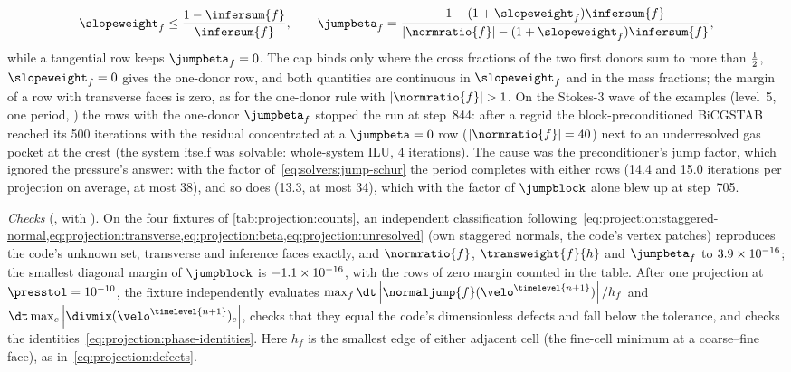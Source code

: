 \begin{equation}\label{eq:projection:dominant-slope}
  \slopeweight_f\le\frac{1-\infersum{f}}{\infersum{f}},\qquad
  \jumpbeta_f=\frac{1-(1+\slopeweight_f)\infersum{f}}{\abs{\normratio{f}}-(1+\slopeweight_f)\infersum{f}},
\end{equation}
while a tangential row keeps $\jumpbeta_f=0$. The cap binds only where the
cross fractions of the two first donors sum to more than $\frac{1}{2}$,
$\slopeweight_f=0$
gives the one-donor row, and both quantities are continuous in
$\slopeweight_f$ and in the mass fractions; the margin of a row with
transverse faces is zero, as for the one-donor rule with
$\abs{\normratio{f}}>1$. On the Stokes-3 wave of the examples (level~5,
one period, ) the rows with the one-donor $\jumpbeta_f$ stopped
the run at step~844: after a regrid the block-preconditioned BiCGSTAB reached
its 500 iterations with the residual concentrated at a $\jumpbeta=0$ row
($\abs{\normratio{f}}=40$) next to an underresolved gas pocket at the crest
(the system itself was solvable: whole-system ILU, 4 iterations). The cause
was the preconditioner's jump factor, which ignored the pressure's answer:
with the factor of~\cref{eq:solvers:jump-schur} the period completes with
either rows (14.4 and 15.0 iterations per projection on average, at most
38), and so does  (13.3, at most 34), which
with the factor of $\jumpblock$ alone blew up at step~705.

\emph{Checks} (, with ). On
the four fixtures of \cref{tab:projection:counts}, an independent classification
following~\cref{eq:projection:staggered-normal,eq:projection:transverse,eq:projection:beta,eq:projection:unresolved}
(own staggered normals, the code's vertex patches) reproduces the code's
unknown set, transverse and inference faces exactly, and $\normratio{f}$,
$\transweight{f}{h}$ and $\jumpbeta_f$ to $3.9\times10^{-16}$; the smallest
diagonal margin of $\jumpblock$ is $-1.1\times10^{-16}$, with the rows of zero margin
counted in the table. After one projection at $\presstol=10^{-10}$, the
fixture independently evaluates $\max_f\dt\abs{\normaljump{f}(\velo^{\timelevel{n+1}})}/h_f$
and $\dt\max_c\abs{\divmix(\velo^{\timelevel{n+1}})_c}$, checks that they
equal the code's dimensionless defects and fall below the tolerance, and
checks the identities~\cref{eq:projection:phase-identities}. Here $h_f$ is
the smallest edge of either adjacent cell (the fine-cell minimum at a
coarse--fine face), as in~\cref{eq:projection:defects}.

